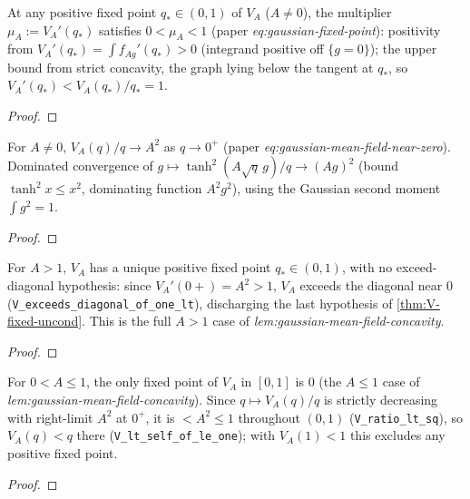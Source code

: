 \begin{lemma}
  \label{lem:V-multiplier}
  \leanok
  At any positive fixed point $q_\ast\in(0,1)$ of $V_A$ ($A\neq0$), the multiplier
  $\mu_A:=V_A'(q_\ast)$ satisfies $0<\mu_A<1$ (paper \emph{eq:gaussian-fixed-point}):
  positivity from $V_A'(q_\ast)=\int f_{Ag}'(q_\ast)>0$ (integrand positive off
  $\{g=0\}$); the upper bound from strict concavity, the graph lying below the tangent
  at $q_\ast$, so $V_A'(q_\ast)<V_A(q_\ast)/q_\ast=1$.
\end{lemma}
\begin{proof}\leanok{}\end{proof}

\begin{lemma}[Near-zero slope $V_A'(0+)=A^2$]
  \label{lem:V-deriv-zero}
  \leanok
  For $A\neq0$, $V_A(q)/q\to A^2$ as $q\to0^+$ (paper
  \emph{eq:gaussian-mean-field-near-zero}). Dominated convergence of
  $g\mapsto\tanh^2(A\sqrt q\,g)/q\to(Ag)^2$ (bound $\tanh^2 x\le x^2$, dominating
  function $A^2g^2$), using the Gaussian second moment $\int g^2=1$.
\end{lemma}
\begin{proof}\leanok\end{proof}

\begin{theorem}
  \label{thm:V-fixed-gt-one}
  \leanok
  For $A>1$, $V_A$ has a unique positive fixed point $q_\ast\in(0,1)$, with no
  exceed-diagonal hypothesis: since $V_A'(0+)=A^2>1$, $V_A$ exceeds the diagonal near
  $0$ (\texttt{V\_exceeds\_diagonal\_of\_one\_lt}), discharging the last hypothesis of
  \cref{thm:V-fixed-uncond}. This is the full $A>1$ case of
  \emph{lem:gaussian-mean-field-concavity}.
\end{theorem}
\begin{proof}\leanok{}\end{proof}

\begin{theorem}
  \label{thm:V-fixed-le-one}
  \leanok
  For $0<A\le1$, the only fixed point of $V_A$ in $[0,1]$ is $0$ (the $A\le1$ case of
  \emph{lem:gaussian-mean-field-concavity}). Since $q\mapsto V_A(q)/q$ is strictly
  decreasing with right-limit $A^2$ at $0^+$, it is $<A^2\le1$ throughout $(0,1)$
  (\texttt{V\_ratio\_lt\_sq}), so $V_A(q)<q$ there (\texttt{V\_lt\_self\_of\_le\_one});
  with $V_A(1)<1$ this excludes any positive fixed point.
\end{theorem}
\begin{proof}\leanok{}\end{proof}

